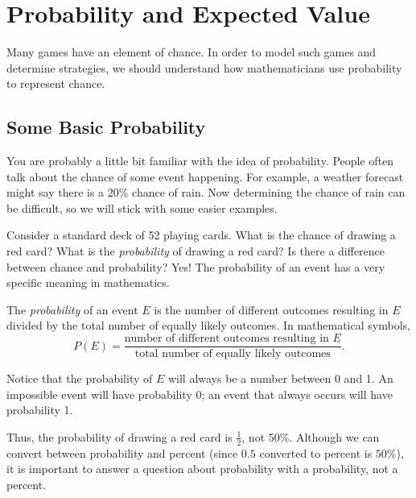 
\section{Probability and Expected Value}

Many games have an element of chance. In order to model such games and determine strategies, we should understand how mathematicians use probability to represent chance.




\subsection{Some Basic Probability}


You are probably a little bit familiar with the idea of probability. People often talk about the chance of some event happening. For example, a weather forecast might say there is a 20\% chance of rain. Now determining the chance of rain can be difficult, so we will stick with some easier examples. 

Consider a standard deck of 52 playing cards. What is the chance of drawing a red card? What is the \emph{probability} of drawing a red card? Is there a difference between chance and probability? Yes! The probability of an event has a very specific meaning in mathematics. 

The \emph{probability} of an event $E$ is the number of different outcomes resulting in $E$ divided by the total number of equally likely outcomes. In mathematical symbols, 
\[P(E)=\frac{\mbox{number of different outcomes resulting in $E$}}{\mbox{total number of equally likely outcomes}}.\]

Notice that the probability of $E$ will always be a number between 0 and 1. An impossible event will have probability 0; an event that always occurs will have probability 1.

Thus, the probability of drawing a red card is $\frac{1}{2}$, not 50\%. Although we can convert between probability and percent (since $0.5$ converted to percent is $50\%$), it is important to answer a question about probability with a probability, not a percent. 

